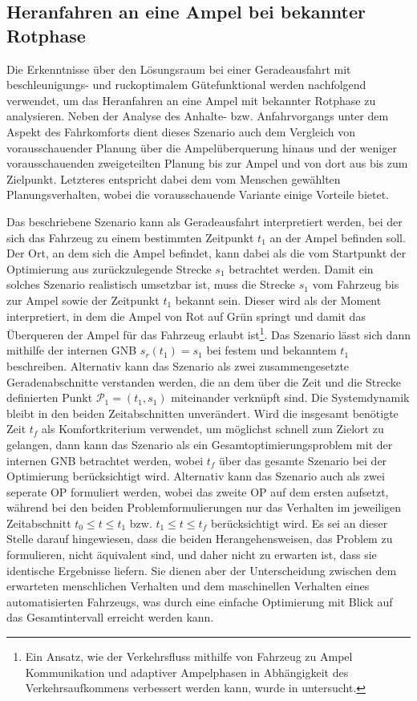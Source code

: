 \subsection{Heranfahren an eine Ampel bei bekannter Rotphase}\label{subsec:Ampelszenario}
Die Erkenntnisse über den Lösungsraum bei einer Geradeausfahrt mit beschleunigungs- und ruckoptimalem Gütefunktional werden nachfolgend verwendet, um das Heranfahren an eine Ampel mit bekannter Rotphase zu analysieren. Neben der Analyse des Anhalte- bzw. Anfahrvorgangs unter dem Aspekt des Fahrkomforts dient dieses Szenario auch dem Vergleich von vorausschauender Planung über die Ampelüberquerung hinaus und der weniger vorausschauenden zweigeteilten Planung bis zur Ampel und von dort aus bis zum Zielpunkt. Letzteres entspricht dabei dem vom Menschen gewählten Planungsverhalten, wobei die vorausschauende Variante einige Vorteile bietet. 

Das beschriebene Szenario kann als Geradeausfahrt interpretiert werden, bei der sich das Fahrzeug zu einem bestimmten Zeitpunkt $t_1$ an der Ampel befinden soll. Der Ort, an dem sich die Ampel befindet, kann dabei als die vom Startpunkt der Optimierung aus zurückzulegende Strecke $s_1$ betrachtet werden. Damit ein solches Szenario realistisch umsetzbar ist, muss die Strecke $s_1$ vom Fahrzeug bis zur Ampel sowie der Zeitpunkt $t_1$ bekannt sein. Dieser wird als der Moment interpretiert, in dem die Ampel von Rot auf Grün springt und damit das Überqueren der Ampel für das Fahrzeug erlaubt ist\footnote{Ein Ansatz, wie der Verkehrsfluss mithilfe von Fahrzeug zu Ampel Kommunikation und adaptiver Ampelphasen in Abhängigkeit des Verkehrsaufkommens verbessert werden kann, wurde in \cite{Gradinescu.22.04.200725.04.2007} untersucht.}. Das Szenario lässt sich dann mithilfe der internen \gls{GNB} $s_r(t_1) = s_1$ bei festem und bekanntem $t_1$ beschreiben. Alternativ kann das Szenario als zwei zusammengesetzte Geradenabschnitte verstanden werden, die an dem über die Zeit und die Strecke definierten Punkt $\mathcal{P}_1 = (t_1, s_1)$ miteinander verknüpft sind. Die Systemdynamik bleibt in den beiden Zeitabschnitten unverändert. Wird die insgesamt benötigte Zeit $t_f$ als Komfortkriterium verwendet, um möglichst schnell zum Zielort zu gelangen, dann kann das Szenario als ein Gesamtoptimierungsproblem mit der internen \gls{GNB} betrachtet werden, wobei $t_f$ über das gesamte Szenario bei der Optimierung berücksichtigt wird. Alternativ kann das Szenario auch als zwei seperate \gls{OP} formuliert werden, wobei das zweite \gls{OP} auf dem ersten aufsetzt, während bei den beiden Problemformulierungen nur das Verhalten im jeweiligen Zeitabschnitt $t_0 \leq t \leq t_1$ bzw. $t_1 \leq t \leq t_f$ berücksichtigt wird. Es sei an dieser Stelle darauf hingewiesen, dass die beiden Herangehensweisen, das Problem zu formulieren, nicht äquivalent sind, und daher nicht zu erwarten ist, dass sie identische Ergebnisse liefern. Sie dienen aber der Unterscheidung zwischen dem erwarteten menschlichen Verhalten und dem maschinellen Verhalten eines automatisierten Fahrzeugs, was durch eine einfache Optimierung mit Blick auf das Gesamtintervall erreicht werden kann.

